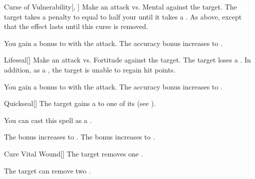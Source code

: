 \lowercase{\hypertarget{spell:Curse of Vulnerability}{}}\label{spell:Curse of Vulnerability}
\begin{freeability}[Rank 4]{\hypertarget{spell:Curse of Vulnerability}{Curse of Vulnerability}}[, ]
Make an attack vs. Mental against the target.
\hit The target takes a penalty to  equal to half your  until it takes a .
\crit As above, except that the effect lasts until this curse is removed.

\rankline
{} You gain a  bonus to  with the attack.
 The accuracy bonus increases to .
\end{freeability}
\vspace{0.25em}



\lowercase{\hypertarget{spell:Lifeseal}{}}\label{spell:Lifeseal}
\begin{freeability}[Rank 4]{\hypertarget{spell:Lifeseal}{Lifeseal}}[]
Make an attack vs. Fortitude against the target.
\hit The target loses a .
In addition, as a , the target is unable to regain hit points.

\rankline
{} You gain a  bonus to  with the attack.
 The accuracy bonus increases to .
\end{freeability}
\vspace{0.25em}



\lowercase{\hypertarget{spell:Quickseal}{}}\label{spell:Quickseal}
\begin{freeability}[Rank 4]{\hypertarget{spell:Quickseal}{Quickseal}}[]
The target gains a   to one of its  (see ).

You can cast this spell as a .

\rankline
{} The bonus increases to .
 The bonus increases to .
\end{freeability}
\vspace{0.25em}



\lowercase{\hypertarget{spell:Cure Vital Wound}{}}\label{spell:Cure Vital Wound}
\begin{apability}[Rank 5]{\hypertarget{spell:Cure Vital Wound}{Cure Vital Wound}}[]
The target removes one .

\rankline
{} The target can remove two .
\end{apability}
\vspace{0.25em}



